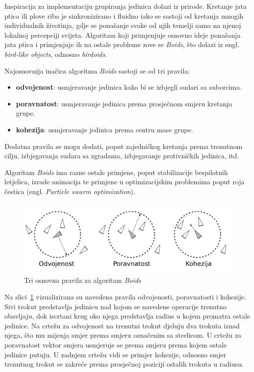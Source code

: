 \documentclass[times, utf8, zavrsni, numeric]{fer}
\begin{document}
\par Inspiracija za implementaciju grupiranja jedinica dolazi iz prirode. 
Kretanje jata ptica ili plove riba je sinkronizirano i fluidno iako se sastoji od kretanja mnogih individualnih životinja, gdje se ponašanje svake od njih temelji samo na njenoj lokalnoj percepciji svijeta.
Algoritam koji primjenjuje osnovno ideje ponašanja jata ptica i primjenjuje ih na ostale probleme zove se \textit{Boids}, što dolazi iz engl. \textit{bird-like objects}, odnosno \textit{birdoids}\cite{article:FlocksHerdsSchools}.

\par Najosnovnija inačica algoritma \textit{Boids} sastoji se od tri pravila:
\begin{itemize}
	\item \textbf{odvojenost}: usmjeravanje jedinica kako bi se izbjegli sudari sa suborcima.
	\item \textbf{poravnatost}: usmjeravanje jedinica prema prosječnom smjeru kretanja grupe.
	\item \textbf{kohezija}: usmjeravanje jedinica prema centru mase grupe. 	 
\end{itemize}
Dodatna pravila se mogu dodati, poput zajedničkog kretanja prema trenutnom cilju, izbjegavanja sudara sa zgradama, izbjegavanje protivničkih jedinica, itd.

\par Algoritam \textit{Boids} ima razne ostale primjene, poput stabilizacije bespilotnih letjelica, izrade animacija te primjene u optimizacijskim problemima poput roja čestica (engl. \textit{Particle swarm optimization}).

\begin{figure}[h]
	\centering
	\includegraphics[width=1.0\linewidth]{images/boids.pdf}
	\caption{Tri osnovna pravila za algoritam \textit{Boids}}
	\label{fig:boids}
\end{figure}

\par Na slici~\ref{fig:boids} vizualizirana su navedena pravila odvojenosti, poravnatosti i kohezije. 
Sivi trokut predstavlja jedinicu nad kojom se navedene operacije trenutno obavljaju, dok iscrtani krug oko njega predstavlja radius u kojem promatra ostale jedinice. 
Na crtežu za odvojenost na trenutni trokut djeluju dva trokuta iznad njega, što mu mijenja smjer prema smjeru označenim sa strelicom. 
U crtežu za poravnatost vektor smjera usmjeruje se prema smjeru prema kojem ostale jedinice putuju. 
U zadnjem crtežu vidi se primjer kohezije, odnosno smjer trenutnog trokut se zakreće prema prosječnoj poziciji ostalih trokuta u radiusu.
\end{document}
